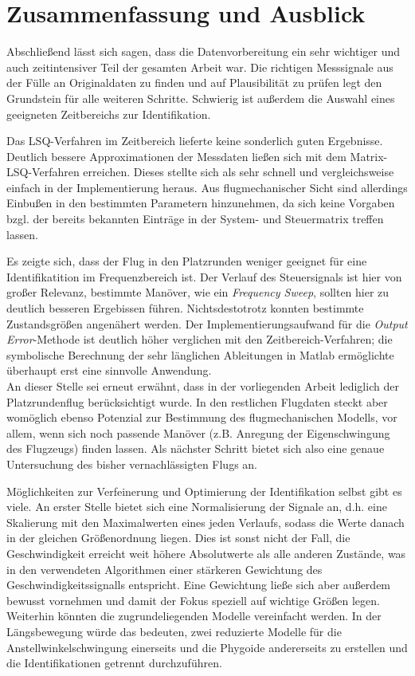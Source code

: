 \chapter{Zusammenfassung und Ausblick}\label{chapter:Zusammenfassung}
Abschließend lässt sich sagen, dass die Datenvorbereitung ein sehr wichtiger und auch zeitintensiver Teil der gesamten Arbeit 
war. Die richtigen Messsignale aus der Fülle an Originaldaten zu finden und auf Plausibilität zu prüfen legt den Grundstein 
für alle weiteren Schritte. Schwierig ist außerdem die Auswahl eines geeigneten Zeitbereichs zur Identifikation. 

Das LSQ-Verfahren im Zeitbereich lieferte keine sonderlich guten Ergebnisse. Deutlich bessere Approximationen der Messdaten 
ließen sich mit dem Matrix-LSQ-Verfahren erreichen. Dieses stellte sich als sehr schnell und vergleichsweise einfach in der 
Implementierung heraus. Aus flugmechanischer Sicht sind allerdings Einbußen in den bestimmten Parametern hinzunehmen, da sich 
keine Vorgaben bzgl. der bereits bekannten Einträge in der System- und Steuermatrix treffen lassen.

Es zeigte sich, dass der Flug in den Platzrunden weniger geeignet für eine Identifikatition im Frequenzbereich ist. Der 
Verlauf des Steuersignals ist hier von großer Relevanz, bestimmte Manöver, wie ein \textit{Frequency Sweep}, sollten hier zu 
deutlich besseren Ergebissen führen. Nichtsdestotrotz konnten bestimmte Zustandsgrößen angenähert werden. Der 
Implementierungsaufwand für die \textit{Output Error}-Methode ist deutlich höher verglichen mit den Zeitbereich-Verfahren; 
die symbolische Berechnung der sehr länglichen Ableitungen in Matlab ermöglichte überhaupt erst eine sinnvolle Anwendung.\\

An dieser Stelle sei erneut erwähnt, dass in der vorliegenden Arbeit lediglich der Platzrundenflug berücksichtigt wurde. In 
den restlichen Flugdaten steckt aber womöglich ebenso Potenzial zur Bestimmung des flugmechanischen Modells, vor allem, wenn 
sich noch passende Manöver (z.B. Anregung der Eigenschwingung des Flugzeugs) finden lassen. Als nächster Schritt bietet sich 
also eine genaue Untersuchung des bisher vernachlässigten Flugs an.

Möglichkeiten zur Verfeinerung und Optimierung der Identifikation selbst gibt es viele. An erster Stelle bietet sich eine 
Normalisierung der Signale an, d.h. eine Skalierung mit den Maximalwerten eines jeden Verlaufs, sodass die Werte danach in 
der gleichen Größenordnung liegen. Dies ist sonst nicht der Fall, die Geschwindigkeit erreicht weit höhere Absolutwerte als 
alle anderen Zustände, was in den verwendeten Algorithmen einer stärkeren Gewichtung des Geschwindigkeitssignalls entspricht. 
Eine Gewichtung 
ließe sich aber außerdem bewusst vornehmen und damit der Fokus speziell auf wichtige Größen legen. Weiterhin könnten die 
zugrundeliegenden Modelle vereinfacht werden. In der Längsbewegung würde das bedeuten, zwei reduzierte Modelle für die 
Anstellwinkelschwingung einerseits und die Phygoide andererseits zu erstellen und die Identifikationen getrennt durchzuführen.

